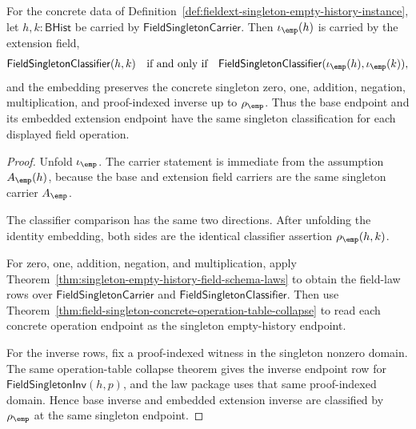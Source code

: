 \begin{theorem}
\label{thm:fieldext-singleton-embedding-obligations}
For the concrete data of
Definition~\ref{def:fieldext-singleton-empty-history-instance}, let
$h,k:\mathsf{BHist}$ be carried by $\mathsf{FieldSingletonCarrier}$. Then
$\iota_{\emp}(h)$ is carried by the extension field,
$$
\mathsf{FieldSingletonClassifier}(h,k)\quad\text{if and only if}\quad
\mathsf{FieldSingletonClassifier}(\iota_{\emp}(h),\iota_{\emp}(k)),
$$
and the embedding preserves the concrete singleton zero, one, addition,
negation, multiplication, and proof-indexed inverse up to $\rho_{\emp}$.
Thus the base endpoint and its embedded extension endpoint have the same
singleton classification for each displayed field operation.
\end{theorem}
\begin{proof}
Unfold $\iota_{\emp}$. The carrier statement is immediate from the assumption
$A_{\emp}(h)$, because the base and extension field carriers are the same
singleton carrier $A_{\emp}$.

The classifier comparison has the same two directions. After unfolding the
identity embedding, both sides are the identical classifier assertion
$\rho_{\emp}(h,k)$.

For zero, one, addition, negation, and multiplication, apply
Theorem~\ref{thm:singleton-empty-history-field-schema-laws} to obtain the
field-law rows over $\mathsf{FieldSingletonCarrier}$ and
$\mathsf{FieldSingletonClassifier}$. Then use
Theorem~\ref{thm:field-singleton-concrete-operation-table-collapse} to read
each concrete operation endpoint as the singleton empty-history endpoint.

For the inverse rows, fix a proof-indexed witness in the singleton nonzero
domain. The same operation-table collapse theorem gives the inverse endpoint
row for $\mathsf{FieldSingletonInv}(h,p)$, and the law package uses that same
proof-indexed domain. Hence base inverse and embedded extension inverse are
classified by $\rho_{\emp}$ at the same singleton endpoint.
\end{proof}

